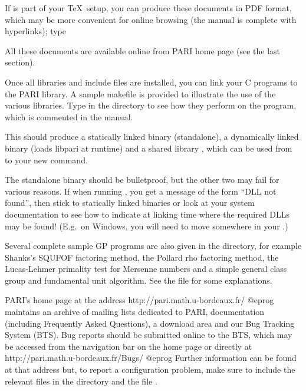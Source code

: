 \noindent If  is part of your \TeX\ setup, you can produce these
documents in PDF format, which may be more convenient for online browsing
(the manual is complete with hyperlinks); type


\noindent All these documents are available online from PARI home page
(see the last section).

 Once all libraries and include files are installed,
you can link your C programs to the PARI library. A sample makefile
 is provided to illustrate the use of the various
libraries. Type  in the  directory to see how
they perform on the  program, which is commented in the
manual.

This should produce a statically linked binary 
(standalone), a dynamically linked binary  (loads libpari
at runtime) and a shared library , which can be used from
 to  your new  command.

The standalone binary should be bulletproof, but the other two may fail
for various reasons. If when running , you get a message
of the form ``DLL not found'', then stick to statically linked binaries
or look at your system documentation to see how to indicate at linking
time where the required DLLs may be found! (E.g.~on Windows, you will
need to move  somewhere in your .)

 Several complete sample GP programs are also given in
the  directory, for example Shanks's SQUFOF factoring method,
the Pollard rho factoring method, the Lucas-Lehmer primality test for
Mersenne numbers and a simple general class group and fundamental unit
algorithm. See the file  for some explanations.

 PARI's home page at the address
\bprog
  http://pari.math.u-bordeaux.fr/
@eprog\noindent
maintains an archive of mailing lists dedicated to PARI, documentation
(including Frequently Asked Questions), a download area and our Bug Tracking
System (BTS). Bug reports should be submitted online to the BTS, which may be
accessed from the navigation bar on the home page or directly at
\bprog
  http://pari.math.u-bordeaux.fr/Bugs/
@eprog\noindent
Further information can be found at that address but, to report a
configuration problem, make sure to include the relevant  files in
the  directory and the file .
\smallskip

